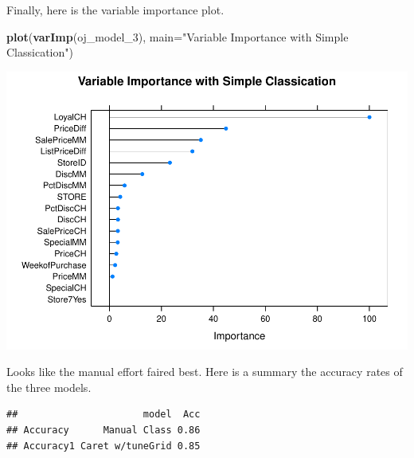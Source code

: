 \documentclass[
]{book}
\newenvironment{Shaded}{\begin{snugshade}}{\end{snugshade}}
\newcommand{\DataTypeTok}[1]{\textcolor[rgb]{0.13,0.29,0.53}{#1}}
\newcommand{\DecValTok}[1]{\textcolor[rgb]{0.00,0.00,0.81}{#1}}
\newcommand{\KeywordTok}[1]{\textcolor[rgb]{0.13,0.29,0.53}{\textbf{#1}}}
\newcommand{\NormalTok}[1]{#1}
\newcommand{\OperatorTok}[1]{\textcolor[rgb]{0.81,0.36,0.00}{\textbf{#1}}}
\newcommand{\StringTok}[1]{\textcolor[rgb]{0.31,0.60,0.02}{#1}}
\begin{document}
Finally, here is the variable importance plot.

\begin{Shaded}
\begin{Highlighting}[]
\KeywordTok{plot}\NormalTok{(}\KeywordTok{varImp}\NormalTok{(oj_model_}\DecValTok{3}\NormalTok{), }\DataTypeTok{main=}\StringTok{"Variable Importance with Simple Classication"}\NormalTok{)}
\end{Highlighting}
\end{Shaded}

\includegraphics{data-sci_files/figure-latex/unnamed-chunk-91-1.pdf}

Looks like the manual effort faired best. Here is a summary the accuracy rates of the three models.

\begin{Shaded}
\end{Shaded}

\begin{verbatim}
##                      model  Acc
## Accuracy      Manual Class 0.86
## Accuracy1 Caret w/tuneGrid 0.85
\end{verbatim}
\end{document}

